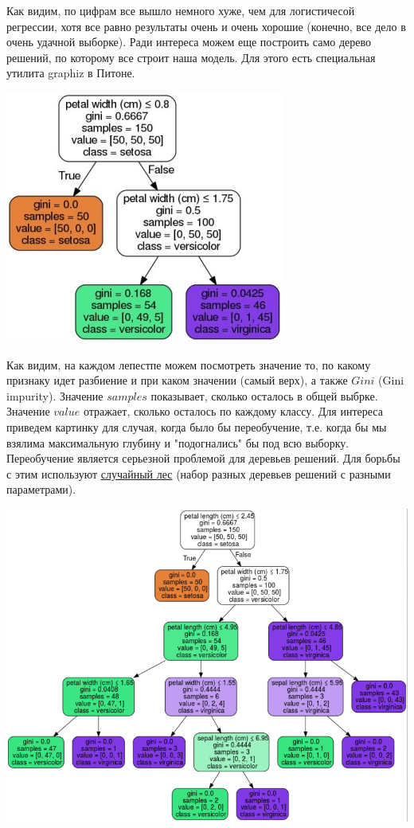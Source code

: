\documentclass[11pt]{article}
\makeatletter
\def\maxwidth{\ifdim\Gin@nat@width>\linewidth\linewidth
    \else\Gin@nat@width\fi}
\let\Oldincludegraphics\includegraphics
\renewcommand{\includegraphics}[1]{\Oldincludegraphics[width=.8\maxwidth]{#1}}
\makeatother
\begin{document}
    Как видим, по цифрам все вышло немного хуже, чем для логистичесой
регрессии, хотя все равно результаты очень и очень хорошие (конечно, все
дело в очень удачной выборке). Ради интереса можем еще построить само
дерево решений, по которому все строит наша модель. Для этого есть
специальная утилита graphiz в Питоне.

    \begin{center}
\includegraphics{WD_2zN-HSBE.jpg}
\end{center}

    Как видим, на каждом лепестпе можем посмотреть значение то, по какому
признаку идет разбиение и при каком значении (самый верх), а также
\(Gini\) (Gini impurity). Значение \(samples\) показывает, сколько
осталось в общей выбрке. Значение \(value\) отражает, сколько осталось
по каждому классу. Для интереса приведем картинку для случая, когда было
бы переобучение, т.е. когда бы мы взялима максимальную глубину и
"подогнались" бы под всю выборку. Переобучение является серьезной
проблемой для деревьев решений. Для борьбы с этим используют
\href{https://www.google.ru/url?sa=t\&rct=j\&q=\&esrc=s\&source=web\&cd=1\&ved=0ahUKEwjB2uzMrKfXAhUjJ5oKHQ8uD8wQFggnMAA\&url=https\%3A\%2F\%2Fru.wikipedia.org\%2Fwiki\%2FRandom_forest\&usg=AOvVaw0OOhfoOzsrok1ODyf-jO-I}{случайный
лес} (набор разных деревьев решений с разными параметрами).

    \begin{center}
\includegraphics{iris.png}
\end{center}
\end{document}
